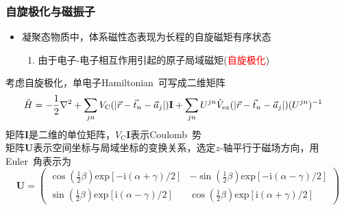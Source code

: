 \frame
{
	\frametitle{自旋极化与磁振子}
	\begin{itemize}
		\item 凝聚态物质中，体系磁性态表现为长程的自旋磁矩有序状态
			\begin{enumerate}
				\item 由于电子-电子相互作用引起的原子局域磁矩(\textcolor{red}{自旋极化})
			\end{enumerate}
	\end{itemize}
		考虑自旋极化，单电子\textrm{Hamiltonian~}可写成二维矩阵
			\begin{displaymath}
				\hspace*{-10pt}\hat H=-\frac12\nabla^2+\sum_{jn}V_{\mathrm C}(|\vec r-\vec t_n-\vec a_j|)\mathbf{I}+\sum_{jn}U^{jn}\hat{V}_{\mathrm{ex}}(|\vec r-\vec t_n-\vec a_j|)(U^{jn})^{-1}
			\end{displaymath}
			矩阵$\mathbf{I}$是二维的单位矩阵，$V_{\mathrm{C}}\mathbf{I}$表示\textrm{Coulomb~}势\\
			矩阵$\mathbf{U}$表示空间坐标与局域坐标的变换关系，选定$z$-轴平行于磁场方向，用\textrm{Euler~}角表示为
			\begin{displaymath}
				\mathbf{U}=\left(
				\begin{matrix}
					\cos(\frac12\beta)\mathrm{exp}[-\mathrm{i}(\alpha+\gamma)/2] &-\sin(\frac12\beta)\mathrm{exp}[-\mathrm{i}(\alpha-\gamma)/2]\\
					\sin(\frac12\beta)\mathrm{exp}[\mathrm{i}(\alpha-\gamma)/2] &\cos(\frac12\beta)\mathrm{exp}[\mathrm{i}(\alpha+\gamma)/2]
				\end{matrix}\right)
			\end{displaymath}
		}


